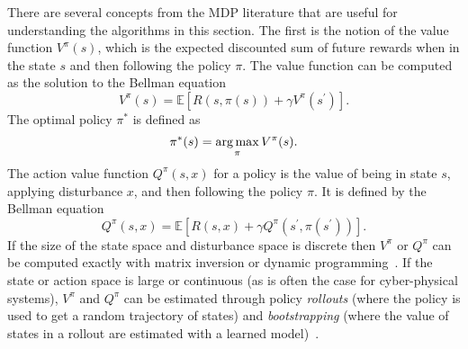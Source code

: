 There are several concepts from the MDP literature that are useful for understanding the algorithms in this section. The first is the notion of the value function $V^\pi(s)$, which is the expected discounted sum of future rewards when in the state $s$ and then following the policy $\pi$. The value function can be computed as the solution to the Bellman equation
\begin{equation}
    V^\pi(s) = \mathbb{E}\left[ R\left(s, \pi(s)\right) + \gamma V^\pi(s^\prime) \right] \text{.} \label{eq:ch2_bellman_v}
\end{equation}
The optimal policy $\pi^*$ is defined as 
\begin{equation}
    \pi^*(s) = \argmax_{\pi} V^\pi(s) \text{.}
\end{equation}
The action value function $Q^\pi(s, x)$ for a policy is the value of being in state $s$, applying disturbance $x$, and then following the policy $\pi$. It is defined by the Bellman equation
\begin{equation}
    Q^\pi(s,x) = \mathbb{E}\left[ R(s, x) + \gamma Q^\pi\left(s^\prime, \pi(s^\prime)\right) \right]\text{.} \label{eq:ch2_bellman_q}
\end{equation}
If the size of the state space and disturbance space is discrete then $V^\pi$ or $Q^\pi$ can be computed exactly with matrix inversion or dynamic programming~\cite{dmubook}. If the state or action space is large or continuous (as is often the case for cyber-physical systems), $V^\pi$ and $Q^\pi$ can be estimated through policy \emph{rollouts} (where the policy is used to get a random trajectory of states) and \emph{bootstrapping} (where the value of states in a rollout are estimated with a learned model)~\cite{sutton2018reinforcement}. 

